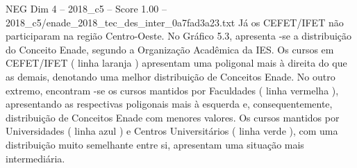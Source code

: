 \begin{textsample}{NEG Dim 4 – 2018\_c5 – Score 1.00 – 2018\_c5/enade\_2018\_tec\_des\_inter\_0a7fad3a23.txt}
Já os CEFET/IFET não participaram na região Centro-Oeste.
No Gráfico 5.3, apresenta -se a distribuição do Conceito Enade, segundo a Organização Acadêmica da IES.
Os cursos em CEFET/IFET ( linha laranja ) apresentam uma poligonal mais à direita do que as demais, denotando uma melhor distribuição de Conceitos Enade.
No outro extremo, encontram -se os cursos mantidos por Faculdades ( linha vermelha ), apresentando as respectivas poligonais mais à esquerda e, consequentemente, distribuição de Conceitos Enade com menores valores.
Os cursos mantidos por Universidades ( linha azul ) e Centros Universitários ( linha verde ), com uma distribuição muito semelhante entre si, apresentam uma situação mais intermediária.

\end{textsample}
